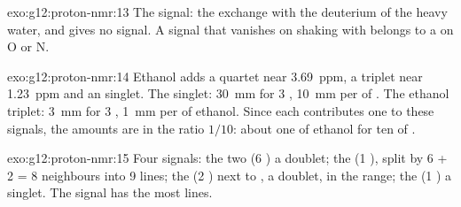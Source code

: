 \begin{solution}{exo:g12:proton-nmr:13}
The  signal: the   exchange with the deuterium of
the heavy water, and  gives no  signal. A signal that
vanishes on shaking with  belongs to a  on O or N.
\end{solution}

\begin{solution}{exo:g12:proton-nmr:14}
Ethanol adds a quartet near \qty{3.69}{ppm}, a triplet near
\qty{1.23}{ppm} and an  singlet. The  singlet: \qty{30}{mm}
for 3 , \qty{10}{mm} per  of . The ethanol triplet:
\qty{3}{mm} for 3 , \qty{1}{mm} per  of ethanol. Since each
 contributes one  to these signals, the amounts are in
the ratio $1/10$: about one  of ethanol for ten of .
\end{solution}

\begin{solution}{exo:g12:proton-nmr:15}
Four signals: the two  (6 ) a doublet; the  (1
), split by 6 + 2 = 8 neighbours into 9 lines; the  (2
) next to , a doublet, in the  range; the
 (1 ) a singlet. The  signal has the most lines.
\end{solution}

